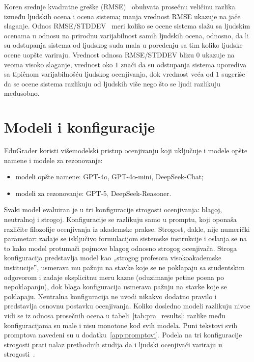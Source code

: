 Koren srednje kvadratne greške (RMSE)~\cite{hodson2022root} obuhvata prosečnu veličinu razlika između ljudskih ocena i ocena sistema;
manja vrednost RMSE ukazuje na jače slaganje.
Odnos RMSE/STDDEV~\cite{moriasi2007model} meri koliko se ocene sistema slažu sa ljudskim ocenama
u odnosu na prirodnu varijabilnost samih ljudskih ocena,
odnosno, da li su odstupanja sistema od ljudskog suda mala u poređenju sa tim koliko ljudske ocene uopšte variraju.
Vrednost odnosa RMSE/STDDEV blizu $0$ ukazuje na veoma visoko slaganje,
vrednost oko $1$ znači da su odstupanja sistema uporediva sa tipičnom varijabilnošću ljudskog ocenjivanja,
dok vrednost veća od $1$ sugeriše da se ocene sistema razlikuju od ljudskih više nego što se ljudi razlikuju međusobno.

\section{Modeli i konfiguracije}
\label{sec:modeli}

EduGrader koristi višemodelski pristup ocenjivanju koji uključuje i modele opšte namene i modele za rezonovanje:
\begin{itemize}
    \item modeli opšte namene: GPT-4o, GPT-4o-mini, DeepSeek-Chat;
    \item modeli za rezonovanje: GPT-5, DeepSeek-Reasoner.
\end{itemize}
Svaki model evaluiran je u tri konfiguracije strogosti ocenjivanja: blagoj, neutralnoj i strogoj.
Konfiguracije se razlikuju samo u promptu, koji oponaša različite filozofije ocenjivanja iz akademske prakse.
Strogost, dakle, nije numerički parametar:
zadaje se isključivo formulacijom sistemske instrukcije
i oslanja se na to kako model protumači pojmove blagog odnosno strogog ocenjivača.
Stroga konfiguracija predstavlja model kao „strogog profesora visokoakademske institucije'',
usmerava mu pažnju na stavke koje se ne poklapaju sa studentskim odgovorom i zadaje eksplicitnu meru kazne (oduzimanje petine poena po nepoklapanju),
dok blaga konfiguracija usmerava pažnju na stavke koje se poklapaju.
Neutralna konfiguracija ne uvodi nikakvo dodatno pravilo i predstavlja osnovnu postavku ocenjivanja.
Koliko dosledno modeli razlikuju nivoe vidi se iz odnosa prosečnih ocena u tabeli~\ref{tab:pra_results}:
razlike među konfiguracijama su male i nisu monotone kod svih modela.
Puni tekstovi svih promptova navedeni su u dodatku~\ref{app:promptovi}.
Podela na tri konfiguracije strogosti prati nalaz prethodnih studija da i ljudski ocenjivači variraju u strogosti~\cite{jukiewicz2024future}.

